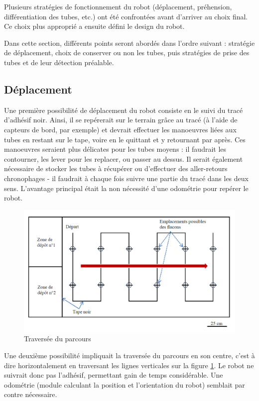\documentclass[a4paper,11pt]{article}
\begin{document}
Plusieurs stratégies de fonctionnement du robot (déplacement, préhension, différentiation des tubes, etc.) ont été confrontées avant d'arriver au choix final. Ce choix plus approprié a ensuite défini le design du robot.

Dans cette section, différents points seront abordés dans l'ordre suivant : stratégie de déplacement, choix de conserver ou non les tubes, puis stratégies de prise des tubes et de leur détection préalable.

\subsection{\label{subsec:choix}Déplacement}

Une première possibilité de déplacement du robot consiste en le suivi du tracé d'adhésif noir. Ainsi, il se repérerait sur le terrain grâce au tracé (à l'aide de capteurs de bord, par exemple) et devrait effectuer les manoeuvres liées aux tubes en restant sur le tape, voire en le quittant et y retournant par après. Ces manoeuvres seraient plus délicates pour les tubes moyens : il faudrait les contourner, les lever pour les replacer, ou passer au dessus. Il serait également nécessaire de stocker les tubes à récupérer ou d'effectuer des aller-retours chronophages - il faudrait à  chaque fois suivre une partie du tracé dans les deux sens. L'avantage principal était la non nécessité d'une odométrie pour repérer le robot.

\begin{figure}[H]
    \centering
    \includegraphics[scale = 0.4]{sens_parcours.PNG}
    \caption{Traversée du parcours}\label{parcours}
\end{figure}
\newpage

Une deuxième possibilité impliquait la traversée du parcours en son centre, c'est à dire horizontalement en traversant les lignes verticales sur la figure \ref{parcours}. Le robot ne suivrait donc pas l'adhésif, permettant gain de temps considérable. Une odométrie (module calculant la position et l'orientation du robot) semblait par contre nécessaire.
\end{document}
